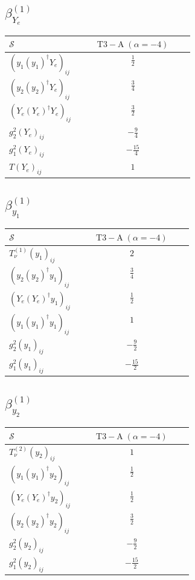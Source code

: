 \documentclass[9pt]{article}
\begin{document}
\subsection*{$ \beta_{Y_e}^{(1)} $}
\begin{longtable}{@{}p{0.38\linewidth}c@{}}
\toprule
$\mathcal{S}$ & $ \mathrm{T3-A}\;(\alpha=-4) $ \\
\midrule
$ (y_1 (y_1)^{\dagger} Y_e)_{ij} $ & $ \frac{1}{2} $ \\
$ (y_2 (y_2)^{\dagger} Y_e)_{ij} $ & $ \frac{3}{4} $ \\
$ (Y_e (Y_e)^{\dagger} Y_e)_{ij} $ & $ \frac{3}{2} $ \\
$ g_2^2 (Y_e)_{ij} $ & $ - \frac{9}{4} $ \\
$ g_1^2 (Y_e)_{ij} $ & $ - \frac{15}{4} $ \\
$ T (Y_e)_{ij} $ & $ 1 $ \\
\bottomrule
\end{longtable}
\subsection*{$ \beta_{y_1}^{(1)} $}
\begin{longtable}{@{}p{0.38\linewidth}c@{}}
\toprule
$\mathcal{S}$ & $ \mathrm{T3-A}\;(\alpha=-4) $ \\
\midrule
$ T_{\nu}^{(1)} (y_1)_{ij} $ & $ 2 $ \\
$ (y_2 (y_2)^{\dagger} y_1)_{ij} $ & $ \frac{3}{4} $ \\
$ (Y_e (Y_e)^{\dagger} y_1)_{ij} $ & $ \frac{1}{2} $ \\
$ (y_1 (y_1)^{\dagger} y_1)_{ij} $ & $ 1 $ \\
$ g_2^2 (y_1)_{ij} $ & $ - \frac{9}{2} $ \\
$ g_1^2 (y_1)_{ij} $ & $ - \frac{15}{2} $ \\
\bottomrule
\end{longtable}
\subsection*{$ \beta_{y_2}^{(1)} $}
\begin{longtable}{@{}p{0.38\linewidth}c@{}}
\toprule
$\mathcal{S}$ & $ \mathrm{T3-A}\;(\alpha=-4) $ \\
\midrule
$ T_{\nu}^{(2)} (y_2)_{ij} $ & $ 1 $ \\
$ (y_1 (y_1)^{\dagger} y_2)_{ij} $ & $ \frac{1}{2} $ \\
$ (Y_e (Y_e)^{\dagger} y_2)_{ij} $ & $ \frac{1}{2} $ \\
$ (y_2 (y_2)^{\dagger} y_2)_{ij} $ & $ \frac{3}{2} $ \\
$ g_2^2 (y_2)_{ij} $ & $ - \frac{9}{2} $ \\
$ g_1^2 (y_2)_{ij} $ & $ - \frac{15}{2} $ \\
\bottomrule
\end{longtable}
\end{document}
